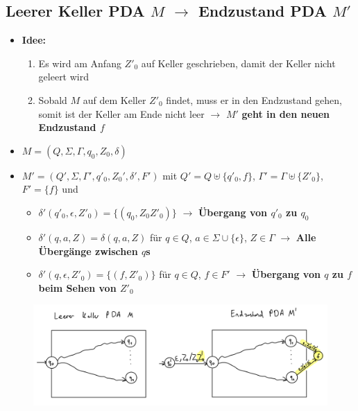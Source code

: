 \documentclass[ieeetran]{article}
\begin{document}
\subsection{Leerer Keller PDA $M$ $\rightarrow$ Endzustand PDA $M'$} %
\label{sub:leerer_keller_pDA_m_rightarrow_endzustand_pDA_m_}
\begin{itemize}
  \item \textbf{Idee:}
	  \begin{enumerate}
	    \item Es wird am Anfang $Z'_0$ auf Keller geschrieben, damit der Keller nicht geleert wird
		\item Sobald $M$ auf dem Keller $Z'_0$ findet, muss er in den Endzustand gehen, somit ist der Keller am Ende nicht leer $\rightarrow$ $M'$ \textbf{geht in den neuen Endzustand $f$}
	  \end{enumerate}

	 \item $M = (Q, \Sigma, \Gamma, q_0, Z_0, \delta)$
	 \item $M' = (Q', \Sigma, \Gamma', q'_0, Z_0', \delta', F')$ mit $Q' = Q \uplus \{q'_0,f\}$, $\Gamma' = \Gamma \uplus \{Z'_0\}$, $F' = \{f\}$ und
		 \begin{itemize}
			 \item $\delta'(q'_0, \epsilon, Z'_0) = \{(q_0, Z_0Z'_0)\}$ $\rightarrow$ \textbf{Übergang von $q'_0$ zu $q_0$}
			 \item $\delta'(q, a, Z) = \delta(q, a, Z)$ für $q \in Q$, $a \in \Sigma \cup \{\epsilon\}$, $Z \in \Gamma$ $\rightarrow$ \textbf{Alle Übergänge zwischen $q$s}
			 \item $\delta'(q, \epsilon, Z'_0) = \{(f, Z'_0)\}$ für $q \in Q$, $f \in F'$ $\rightarrow$ \textbf{Übergang von $q$ zu $f$ beim Sehen von $Z'_0$}
		 \end{itemize}
\end{itemize}
\begin{figure}[h!]
  \centering
  \includegraphics[width=0.52\linewidth]{leertoendpda.jpg}
  \label{fig:leertoendpda_jpg}
\end{figure}
\end{document}
